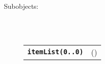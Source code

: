 \begin{description}
  \item[Subobjects:] \hfill \\
\ 
    \begin{tabular}{ll}
      \texttt{\textbf{itemList(0..0)}} & (\Jref{module}{}) \\
    \end{tabular}
\vspace{3mm}

\end{description}


